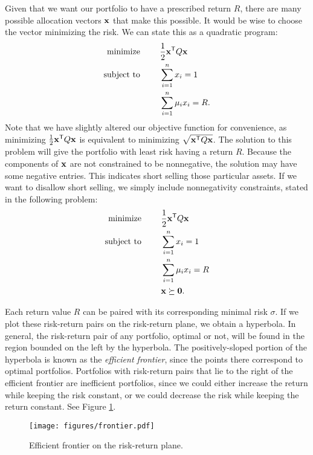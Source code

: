 Given that we want our portfolio to have a prescribed return $R$, there are many possible allocation vectors $\mathbf{x}$ that make this possible.
It would be wise to choose the vector minimizing the risk.
We can state this as a quadratic program:
\begin{align*}
\text{minimize }\qquad &\frac{1}{2}\mathbf{x}^{\mathsf T} Q\mathbf{x}\\
\text{subject to }\qquad &\sum_{i=1}^n x_i = 1\\
&\sum_{i=1}^n \mu_ix_i = R.\\
\end{align*}
Note that we have slightly altered our objective function for convenience, as minimizing $\frac{1}{2}\mathbf{x}^{\mathsf T} Q\mathbf{x}$ is equivalent to minimizing $\sqrt{\mathbf{x}^{\mathsf T} Q\mathbf{x}}$.
The solution to this problem will give the portfolio with least risk having a return $R$.
Because the components of $\mathbf{x}$ are not constrained to be nonnegative, the solution may have some negative entries.
This indicates short selling those particular assets.
If we want to disallow short selling, we simply include nonnegativity constraints, stated in the following problem:
\begin{align*}
\text{minimize }\qquad &\frac{1}{2}\mathbf{x}^{\mathsf T} Q\mathbf{x}\\
\text{subject to }\qquad &\sum_{i=1}^n x_i = 1\\
&\sum_{i=1}^n \mu_ix_i = R\\
&\mathbf{x} \succeq \mathbf{0}.
\end{align*}

Each return value $R$ can be paired with its corresponding minimal risk $\sigma$.
If we plot these risk-return pairs on the risk-return plane, we obtain a hyperbola.
In general, the risk-return pair of any portfolio, optimal or not, will be found in the region bounded on the left by the hyperbola.
The positively-sloped portion of the hyperbola is known as the
\emph{efficient frontier}, since the points there correspond to optimal portfolios.
Portfolios with risk-return pairs that lie to the right of the efficient frontier are inefficient portfolios, since we could either increase the return while keeping the risk constant, or we could decrease the risk while keeping the return constant.
See Figure \ref{fig:frontier}.

\begin{figure}[H]
\texttt{[image: figures/frontier.pdf]}
\caption{Efficient frontier on the risk-return plane.}
\label{fig:frontier}
\end{figure}

